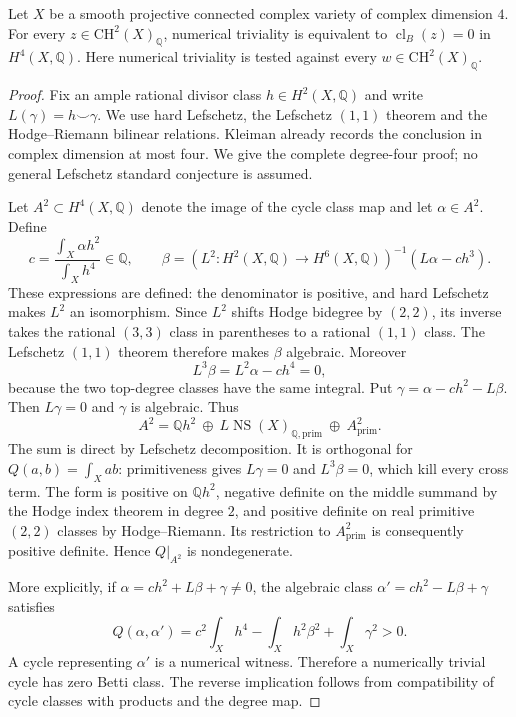 \begin{theorem}\label{B:betti}
Let $X$ be a smooth projective connected complex variety of complex dimension $4$. For every $z\in\mathrm{CH}^2(X)_{\mathbb Q}$, numerical triviality is equivalent to $\operatorname{cl}_B(z)=0$ in $H^4(X,\mathbb Q)$. Here numerical triviality is tested against every $w\in\mathrm{CH}^2(X)_{\mathbb Q}$.
\end{theorem}
\begin{proof}
Fix an ample rational divisor class $h\in H^2(X,\mathbb Q)$ and write $L(\gamma)=h\smile\gamma$. We use hard Lefschetz, the Lefschetz $(1,1)$ theorem and the Hodge--Riemann bilinear relations. Kleiman \cite[\S3, Propositions 3.1, 3.8, Corollary 3.9 and Remarks 3.4, 3.10]{BKleiman1968} already records the conclusion in complex dimension at most four. We give the complete degree-four proof; no general Lefschetz standard conjecture is assumed.

Let $A^2\subset H^4(X,\mathbb Q)$ denote the image of the cycle class map and let $\alpha\in A^2$. Define
\[
 c=\frac{\int_X\alpha h^2}{\int_Xh^4}\in\mathbb Q,
 \qquad
 \beta=(L^2:H^2(X,\mathbb Q)\longrightarrow H^6(X,\mathbb Q))^{-1}
             (L\alpha-c h^3).
\]
These expressions are defined: the denominator is positive, and hard Lefschetz makes $L^2$ an isomorphism. Since $L^2$ shifts Hodge bidegree by $(2,2)$, its inverse takes the rational $(3,3)$ class in parentheses to a rational $(1,1)$ class. The Lefschetz $(1,1)$ theorem therefore makes $\beta$ algebraic. Moreover
\[
 L^3\beta=L^2\alpha-c h^4=0,
\]
because the two top-degree classes have the same integral. Put $\gamma=\alpha-c h^2-L\beta$. Then $L\gamma=0$ and $\gamma$ is algebraic. Thus
\[
 A^2=\mathbb Qh^2\ \oplus\ L\operatorname{NS}(X)_{\mathbb Q,\mathrm{prim}}
                 \ \oplus\ A^2_{\mathrm{prim}}.
\]
The sum is direct by Lefschetz decomposition. It is orthogonal for $Q(a,b)=\int_Xab$: primitiveness gives $L\gamma=0$ and $L^3\beta=0$, which kill every cross term. The form is positive on $\mathbb Qh^2$, negative definite on the middle summand by the Hodge index theorem in degree $2$, and positive definite on real primitive $(2,2)$ classes by Hodge--Riemann. Its restriction to $A^2_{\mathrm{prim}}$ is consequently positive definite. Hence $Q|_{A^2}$ is nondegenerate.

More explicitly, if $\alpha=c h^2+L\beta+\gamma\ne0$, the algebraic class $\alpha'=c h^2-L\beta+\gamma$ satisfies
\[
 Q(\alpha,\alpha')=c^2\!\int_Xh^4-\!\int_Xh^2\beta^2+\!\int_X\gamma^2>0.
\]
A cycle representing $\alpha'$ is a numerical witness. Therefore a numerically trivial cycle has zero Betti class. The reverse implication follows from compatibility of cycle classes with products and the degree map.
\end{proof}


